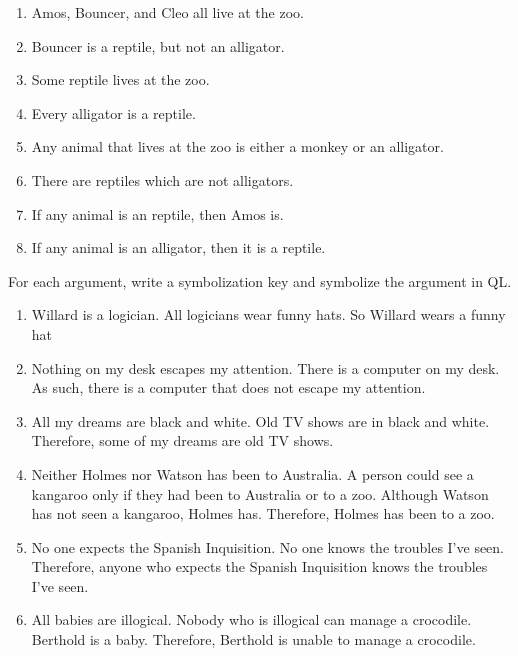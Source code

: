 \begin{enumerate}
\item Amos, Bouncer, and Cleo all live at the zoo.
\item Bouncer is a reptile, but not an alligator.
\item Some reptile lives at the zoo.
\item Every alligator is a reptile.
\item Any animal that lives at the zoo is either a monkey or an alligator.
\item There are reptiles which are not alligators.
\item If any animal is an reptile, then Amos is.
\item If any animal is an alligator, then it is a reptile.
\end{enumerate}

\problempart
\label{pr.FOLarguments}
For each argument, write a symbolization key and symbolize the argument in QL.
\begin{enumerate}
\item Willard is a logician. All logicians wear funny hats. So Willard wears a funny hat
\item Nothing on my desk escapes my attention. There is a computer on my desk. As such, there is a computer that does not escape my attention.
\item All my dreams are black and white. Old TV shows are in black and white. Therefore, some of my dreams are old TV shows.
\item Neither Holmes nor Watson has been to Australia. A person could see a kangaroo only if they had been to Australia or to a zoo. Although Watson has not seen a kangaroo, Holmes has. Therefore, Holmes has been to a zoo.
\item No one expects the Spanish Inquisition. No one knows the troubles I've seen. Therefore, anyone who expects the Spanish Inquisition knows the troubles I've seen.
\item All babies are illogical. Nobody who is illogical can manage a crocodile. Berthold is a baby. Therefore, Berthold is unable to manage a crocodile.
\end{enumerate}

